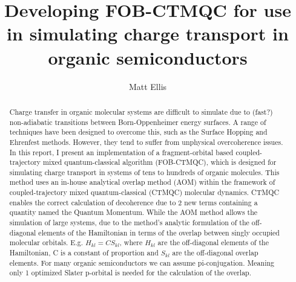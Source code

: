  \makeatletter
\renewcommand {\@degree@string} {Master of Philosophy to Doctor of Philosophy}
 \makeatother

\title{Developing FOB-CTMQC for use in simulating charge transport in organic semiconductors}
\author{Matt Ellis}

\maketitle
\makedeclaration

\begin{abstract} %
Charge transfer in organic molecular systems are difficult to simulate due to (fast?) non-adiabatic transitions between Born-Oppenheimer energy surfaces. A range of techniques have been designed to overcome this, such as the Surface Hopping and Ehrenfest methods. However, they tend to suffer from unphysical overcoherence issues. In this report, I present an implementation of a fragment-orbital based coupled-trajectory mixed quantum-classical algorithm (FOB-CTMQC), which is designed for simulating charge transport in systems of tens to hundreds of organic molecules. This method uses an in-house analytical overlap method (AOM) within the framework of coupled-trajectory mixed quantum-classical (CTMQC) molecular dynamics. CTMQC enables the correct calculation of decoherence due to 2 new terms containing a quantity named the Quantum Momentum. While the AOM method allows the simulation of large systems, due to the method's analytic formulation of the off-diagonal elements of the Hamiltonian in terms of the overlap between singly occupied molecular orbitals. E.g. $H_{kl} = CS_{kl} $, where $H_{kl}$ are the off-diagonal elements of the Hamiltonian, C is a constant of proportion and $S_{kl}$ are the off-diagonal overlap elements. For many organic semiconductors we can assume pi-conjugation. Meaning only 1 optimized Slater p-orbital is needed for the calculation of the overlap. 
\end{abstract}

\setcounter{tocdepth}{2}

\tableofcontents
